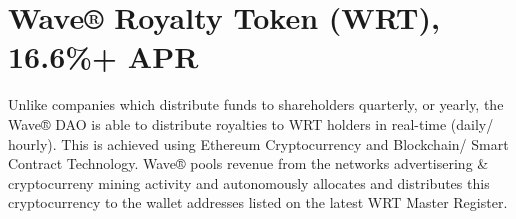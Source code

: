 \documentclass[letterpaper,10pt,english]{sphinxmanual}
\begin{document}
\chapter{Wave® Royalty Token (WRT), 16.6\%+ APR}
\label{\detokenize{wrt-detail:wave-royalty-token-wrt-16-6-apr}}\label{\detokenize{wrt-detail::doc}}
Unlike companies which distribute funds to shareholders quarterly, or yearly, the Wave® DAO is able to distribute royalties to WRT holders in real-time (daily/ hourly).
This is achieved using Ethereum Cryptocurrency and Blockchain/ Smart Contract Technology. Wave® pools revenue from the networks advertisering \& cryptocurreny mining activity and autonomously allocates and distributes this cryptocurrency to the wallet addresses listed on the latest WRT Master Register.


\begin{savenotes}\sphinxatlongtablestart{}
\end{savenotes}
\end{document}

